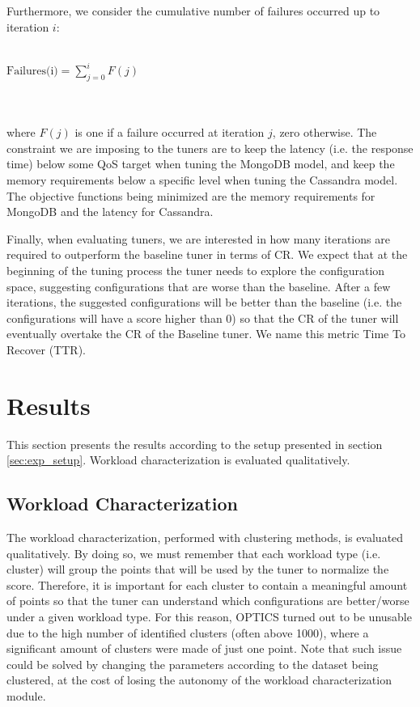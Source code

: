 \documentclass[a4paper, 12pt]{article} %
\begin{document}
	Furthermore, we consider the cumulative number of failures occurred up to iteration $i$:\\\\
	\centerline{
		$
		\text{Failures(i)} = \sum_{j=0}^{i} F(j)
		$
	}\\\\
	where $F(j)$ is one if a failure occurred at iteration $j$, zero otherwise. The constraint we are imposing to the tuners are to keep the latency (i.e. the response time) below some QoS target when tuning the MongoDB model, and keep the memory requirements below a specific level when tuning the Cassandra model.\\
	The objective functions being minimized are the memory requirements for MongoDB and the latency for Cassandra.
	
	Finally, when evaluating tuners, we are interested in how many iterations are required to outperform the baseline tuner in terms of CR. We expect that at the beginning of the tuning process the tuner needs to explore the configuration space, suggesting configurations that are worse than the baseline. After a few iterations, the suggested configurations will be better than the baseline (i.e. the configurations will have a score higher than 0) so that the CR of the tuner will eventually overtake the CR of the Baseline tuner. We name this metric Time To Recover (TTR).
	
	\section{Results } \label{sec:results}
	This section presents the results according to the setup presented in section \ref{sec:exp_setup}. Workload characterization is evaluated qualitatively. 
	
	\subsection{Workload Characterization } \label{ssec:results_wkld_characterization}
	The workload characterization, performed with clustering methods, is evaluated qualitatively.
	By doing so, we must remember that each workload type (i.e. cluster) will group the points that will be used by the tuner to normalize the score. Therefore, it is important for each cluster to contain a meaningful amount of points so that the tuner can understand which configurations are better/worse under a given workload type. For this reason, OPTICS turned out to be unusable due to the high number of identified clusters (often above 1000), where a significant amount of clusters were made of just one point. Note that such issue could be solved by changing the parameters according to the dataset being clustered, at the cost of losing the autonomy of the workload characterization module.  
	
\end{document}
